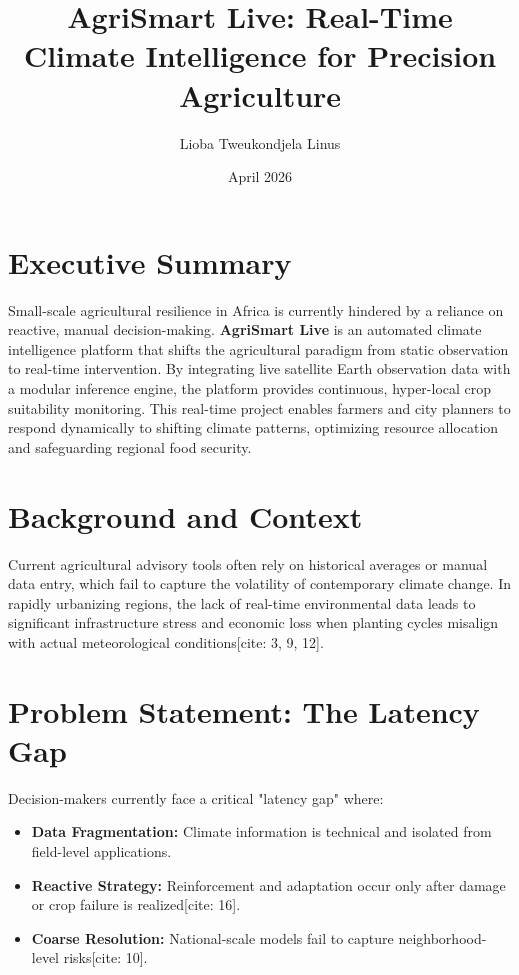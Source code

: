 \documentclass[11pt]{article}
\title{\textbf{AgriSmart Live: Real-Time Climate Intelligence for Precision Agriculture}}
\author{Lioba Tweukondjela Linus}
\date{April 2026}
\begin{document}
\maketitle

\section*{Executive Summary}
Small-scale agricultural resilience in Africa is currently hindered by a reliance on reactive, manual decision-making. \textbf{AgriSmart Live} is an automated climate intelligence platform that shifts the agricultural paradigm from static observation to real-time intervention. By integrating live satellite Earth observation data with a modular inference engine, the platform provides continuous, hyper-local crop suitability monitoring. This real-time project enables farmers and city planners to respond dynamically to shifting climate patterns, optimizing resource allocation and safeguarding regional food security.

\section{Background and Context}
Current agricultural advisory tools often rely on historical averages or manual data entry, which fail to capture the volatility of contemporary climate change. In rapidly urbanizing regions, the lack of real-time environmental data leads to significant infrastructure stress and economic loss when planting cycles misalign with actual meteorological conditions[cite: 3, 9, 12].

\section{Problem Statement: The Latency Gap}
Decision-makers currently face a critical "latency gap" where:
\begin{itemize}[noitemsep]
    \item \textbf{Data Fragmentation:} Climate information is technical and isolated from field-level applications.
    \item \textbf{Reactive Strategy:} Reinforcement and adaptation occur only after damage or crop failure is realized[cite: 16].
    \item \textbf{Coarse Resolution:} National-scale models fail to capture neighborhood-level risks[cite: 10].
\end{itemize}
\end{document}

